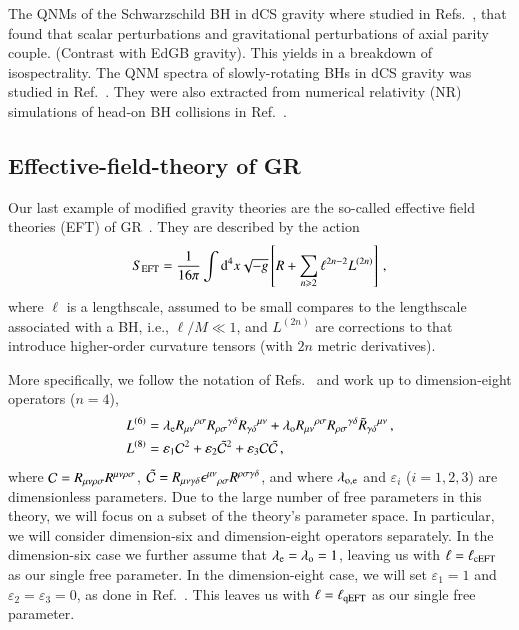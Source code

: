 \documentclass[twocolumn,
               prd,
               aps,
               superscriptaddress,
               tightenlines,
               nofootinbib,
               eqsecnum,
               amsfonts,
               amsmath,
               longbibliography]{revtex4-1}
\newcommand{\dd}{{\rm d}}
\newcommand{\lame}{\lambda_{\rm e}}
\newcommand{\lamo}{\lambda_{\rm o}}
\begin{document}
The QNMs of the Schwarzschild BH in dCS gravity where studied in
Refs.~\cite{Yunes:2007ss,Cardoso:2009pk,Molina:2010fb}, that found that scalar
perturbations and gravitational perturbations of axial parity couple. (Contrast
with EdGB gravity).
%
This yields in a breakdown of isospectrality. The QNM spectra of slowly-rotating BHs in dCS gravity was
studied in Ref.~\cite{Wagle:2021tam}.
%
They were also extracted from numerical relativity (NR) simulations of head-on BH collisions
in Ref.~\cite{Okounkova:2019dfo}.

\subsection{Effective-field-theory of GR}

Our last example of modified gravity theories are the so-called effective field
theories (EFT) of GR~\cite{Endlich:2017tqa,Sennett:2019bpc,deRham:2020ejn,Cano:2020cao,Cano:2021myl}.
%
They are described by the action
%
\begin{equation} \label{eq:action_eft}
    S_{\rm EFT} = \frac{1}{16 \pi}
    \int \dd^4x \sqrt{-g}
    \left[ R
    +
    \sum_{n \geqslant 2} \ell^{2n - 2} L^{(2n)}
    \right]\,,
\end{equation}
%
where $\ell$ is a lengthscale, assumed to be small compares to the lengthscale
associated with a BH, i.e., $\ell / M \ll 1$, and $L^{(2n)}$ are corrections to
that introduce higher-order curvature tensors (with $2n$ metric derivatives).

More specifically, we follow the notation of
Refs.~\cite{Cano:2020cao,Cano:2021myl} and work up to dimension-eight operators
($n=4$),
%
\begin{subequations}
\label{eq:action_mods}
\begin{align}
    L^{(6)} &= \lame R_{\mu\nu}{}^{\rho\sigma} R_{\rho\sigma}{}^{\gamma\delta} R_{\gamma \delta}{}^{\mu\nu}
    + \lamo R_{\mu\nu}{}^{\rho\sigma} R_{\rho\sigma}{}^{\gamma\delta} \tilde{R}_{\gamma \delta}{}^{\mu\nu}\,,
    \label{eq:s_6}
    \\
    L^{(8)} &= \varepsilon_{1} \mathcal{C}^2
    + \varepsilon_{2} \tilde{\mathcal{C}}^{2}
    + \varepsilon_{3} \mathcal{C} \tilde{\mathcal{C}}\,,
\label{eq:s_8}
\end{align}
\end{subequations}
%
where ${\cal C} = R_{\mu\nu\rho\sigma} R^{\mu\nu\rho\sigma}$,
$\tilde{\cal C} = R_{\mu\nu\gamma\delta} \epsilon^{\mu\nu}{}_{\rho\sigma} R^{\rho\sigma\gamma\delta}$,
and where $\lambda_{\rm o, e}$ and $\varepsilon_{i}$ ($i=1,2,3$) are dimensionless parameters.
%
Due to the large number of free parameters in this theory, we will focus on a subset of the theory's
parameter space.
%
In particular, we will consider dimension-six and dimension-eight operators separately.
%
In the dimension-six case we further assume that $\lame = \lamo = 1$, leaving us with $\ell = \ell_{\rm cEFT}$
as our single free parameter.
%
In the dimension-eight case, we will set $\varepsilon_{1} = 1$ and $\varepsilon_{2} = \varepsilon_{3} = 0$,
as done in Ref.~\cite{Sennett:2019bpc}.
%
This leaves us with $\ell = \ell_{\rm qEFT}$ as our single free parameter.
\end{document}
